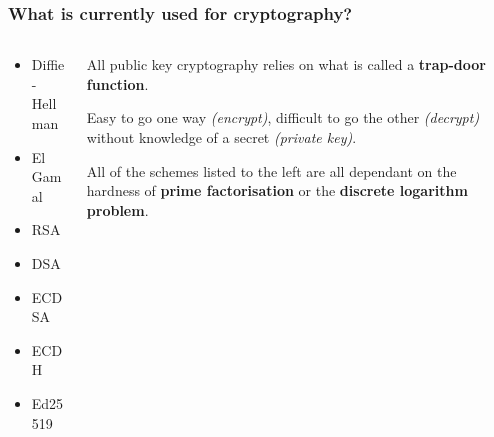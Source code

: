 \documentclass[
aspectratio=169, %
t, %
onlytextwidth, %
10pt, %
]{beamer}
\begin{document}

\begin{frame}
    \frametitle{What is currently used for cryptography?}

    \begin{columns}[T] %
        \begin{column}{0.33\linewidth} %
            \begin{itemize}
                \item Diffie-Hellman
                \item El Gamal
                \item RSA
                \item DSA
                \item ECDSA
                \item ECDH
                \item Ed25519
            \end{itemize}
        \end{column}
        \begin{column}{0.63\linewidth} %
            All public key cryptography relies on what is called a \textbf{trap-door function}.

            Easy to go one way \textit{(encrypt)}, difficult to go the other \textit{(decrypt)} without knowledge of a secret \textit{(private key)}.

            All of the schemes listed to the left are all dependant on the hardness of \textbf{prime factorisation} or the \textbf{discrete logarithm problem}.
        \end{column}
    \end{columns}
\end{frame}

\end{document}

